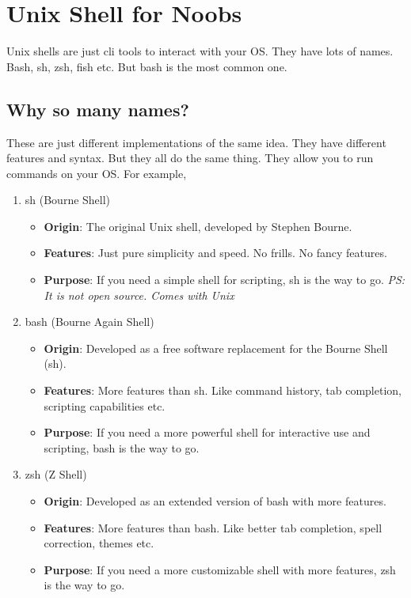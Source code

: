 \section{Unix Shell for Noobs}
Unix shells are just cli tools to interact with your OS. They have lots of names. Bash, sh, zsh, fish etc. But bash is the most common one.

\subsection{Why so many names?}
These are just different implementations of the same idea. They have different features and syntax. But they all do the same thing. They allow you to run commands on your OS. For example,
\begin{enumerate}
    \item sh (Bourne Shell)
    \begin{itemize}
        \item \textbf{Origin}: The original Unix shell, developed by Stephen Bourne.
        \item \textbf{Features}: Just pure simplicity and speed. No frills. No fancy features.
        \item \textbf{Purpose}: If you need a simple shell for scripting, sh is the way to go. \textit{PS: It is not open source. Comes with Unix}
    \end{itemize}
    \item bash (Bourne Again Shell)
    \begin{itemize}
        \item \textbf{Origin}: Developed as a free software replacement for the Bourne Shell (sh).
        \item \textbf{Features}: More features than sh. Like command history, tab completion, scripting capabilities etc.
        \item \textbf{Purpose}: If you need a more powerful shell for interactive use and scripting, bash is the way to go.
    \end{itemize}
    \item zsh (Z Shell)
    \begin{itemize}
        \item \textbf{Origin}: Developed as an extended version of bash with more features.
        \item \textbf{Features}: More features than bash. Like better tab completion, spell correction, themes etc.
        \item \textbf{Purpose}: If you need a more customizable shell with more features, zsh is the way to go.

\end{itemize}
\end{enumerate}
